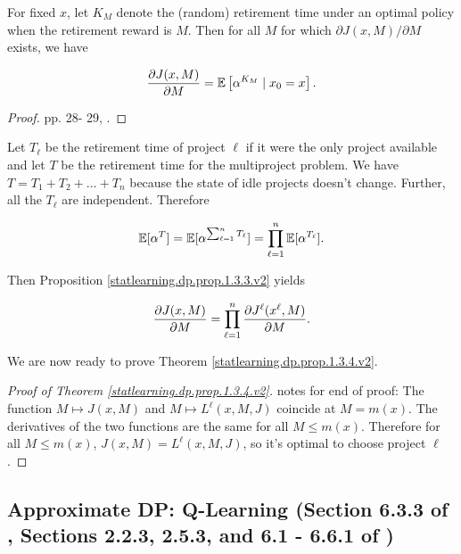 \begin{proposition}\label{statlearning.dp.prop.1.3.3.v2}

For fixed \(x\), let \(K_M\) denote the (random) retirement time under an optimal policy when the retirement reward is \(M\). Then for all \(M\) for which \(\partial J (x, M)/ \partial M\) exists, we have

\[
\frac{\partial J(x, M)}{\partial M} = \mathbb{E} \left[ \alpha^{K_M} \mid x_0 = x \right].
\]

\end{proposition}

\begin{proof}

pp. 28- 29, \citep{v2_bertsekas2012dynamic}.

\end{proof}

Let \(T_\ell\) be the retirement time of project \(\ell\) if it were the only project available and let \(T\) be the retirement time for the multiproject problem. We have \(T = T_1 + T_2 + \ldots + T_n\) because the state of idle projects doesn't change. Further, all the \(T_\ell\) are independent. Therefore

\[
\mathbb{E}[\alpha^T] = \mathbb{E}[\alpha^{\sum_{\ell=1}^n T_\ell} ] = \prod_{\ell=1}^n \mathbb{E}[\alpha^{T_\ell}].
\]

Then Proposition \ref{statlearning.dp.prop.1.3.3.v2} yields

\begin{equation}
\frac{\partial J(x, M)}{\partial M} = \prod_{\ell=1}^n \frac{\partial J^\ell(x^\ell, M)}{\partial M}.
\end{equation}

We are now ready to prove Theorem \ref{statlearning.dp.prop.1.3.4.v2}.

\begin{proof}[Proof of Theorem \ref{statlearning.dp.prop.1.3.4.v2}]

notes for end of proof: The function \(M \mapsto J(x, M)\) and \(M \mapsto L^\ell(x, M, J)\) coincide at \(M = m(x)\). The derivatives of the two functions are the same for all \(M \leq m(x)\). Therefore for all \(M \leq m(x)\), \(J(x,M) = L^\ell(x, M, J)\), so it's optimal to choose project \(\ell\).

\end{proof}

\subsection{Approximate DP: Q-Learning (Section 6.3.3 of \citet{v1_bertsekas2012dynamic}, Sections 2.2.3, 2.5.3, and 6.1 - 6.6.1 of \citep{v2_bertsekas2012dynamic})}

